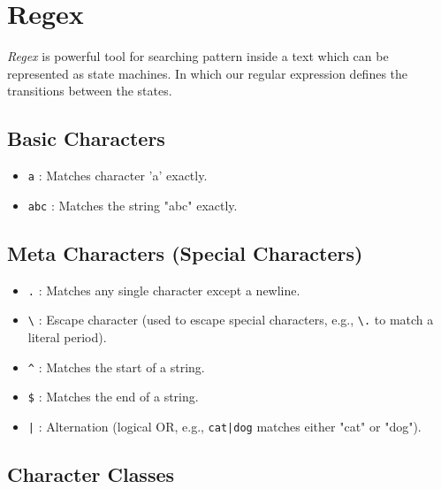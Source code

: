 \newpage
\section{Regex}

\emph{Regex} is powerful tool for searching pattern inside a text which can be represented as state 
machines. In which our regular expression defines the transitions between the states.

\subsection{Basic Characters}

\begin{itemize}
  
    \item \texttt{a} : Matches character 'a' exactly.
  
    \item \texttt{abc} : Matches the string "abc" exactly.

\end{itemize}

\subsection{Meta Characters (Special Characters)}

\begin{itemize}

    \item \texttt{.} : Matches any single character except a newline.

    \item \texttt{\textbackslash} : Escape character (used to escape special characters, e.g., \texttt{\textbackslash.} to match a literal period).

    \item \texttt{\^} : Matches the start of a string.

    \item \texttt{\$} : Matches the end of a string.

    \item \texttt{|} : Alternation (logical OR, e.g., \texttt{cat|dog} matches either "cat" or "dog").

\end{itemize}

\subsection{Character Classes}

